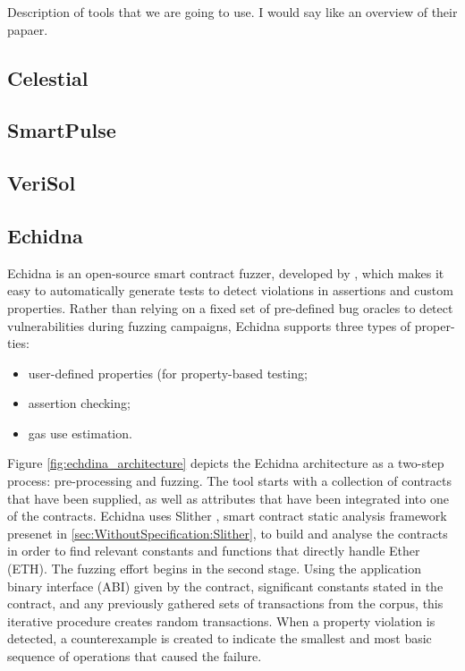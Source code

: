Description of tools that we are going to use. 
I would say like an overview of their papaer.

\subsection{Celestial}
\label{sec:Specification:Celestial}


\subsection{SmartPulse}
\label{sec:Specification:SmartPulse}

\subsection{VeriSol}
\label{sec:Specification:VeriSol}


\subsection{Echidna}
\label{sec:Specification:Echidna}
Echidna is an open-source smart contract fuzzer, developed by \citet{Echidna}, which makes it easy to automatically generate tests to detect violations in
assertions and custom properties.
Rather than relying on a fixed set of pre-defined bug oracles to detect vulnerabilities
during fuzzing campaigns, Echidna supports three types of proper-
ties: 
\begin{itemize}
    \item user-defined properties (for property-based testing;
    \item assertion checking;
    \item gas use estimation.
\end{itemize}

Figure \autoref{fig:echdina_architecture} depicts the Echidna architecture as a two-step process: pre-processing and fuzzing.
The tool starts with a collection of contracts that have been supplied, as well as attributes that have been integrated into one of the contracts.
Echidna uses Slither , smart contract static analysis framework presenet in \autoref{sec:WithoutSpecification:Slither}, to build and analyse the contracts in order to find relevant constants and functions that directly handle Ether (ETH).
The fuzzing effort begins in the second stage. 
Using the application binary interface (ABI) given by the contract, significant constants stated in the contract, 
and any previously gathered sets of transactions from the corpus, this iterative procedure creates random transactions. 
When a property violation is detected, a counterexample is created to indicate the smallest and most basic sequence of operations that caused the failure. 


